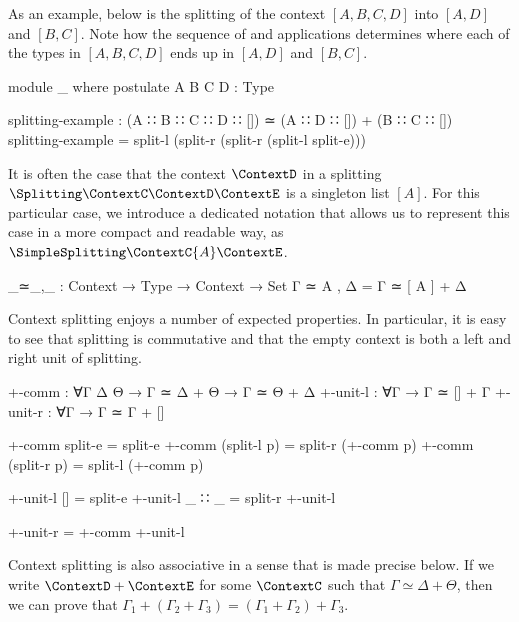 As an example, below is the splitting of the context $[A, B, C, D]$ into $[A,
D]$ and $[B, C]$. Note how the sequence of 
and  applications determines where each of the
types in $[A, B, C, D]$ ends up in $[A, D]$ and $[B, C]$.

\begin{code}[hide]
module _ where
  postulate A B C D : Type
\end{code}
\begin{code}
  splitting-example : (A ∷ B ∷ C ∷ D ∷ []) ≃ (A ∷ D ∷ []) + (B ∷ C ∷ [])
  splitting-example = split-l (split-r (split-r (split-l split-e)))
\end{code}

It is often the case that the context $\ContextD$ in a splitting
$\Splitting\ContextC\ContextD\ContextE$ is a singleton list $[A]$. For this
particular case, we introduce a dedicated notation that allows us to represent
this case in a more compact and readable way, as
$\SimpleSplitting\ContextC{A}\ContextE$.

\begin{code}
_≃_,_ : Context → Type → Context → Set
Γ ≃ A , Δ = Γ ≃ [ A ] + Δ
\end{code}

Context splitting enjoys a number of expected properties. In particular, it is
easy to see that splitting is commutative and that the empty context is both a
left and right unit of splitting.

\begin{code}
+-comm    : ∀{Γ Δ Θ} → Γ ≃ Δ + Θ → Γ ≃ Θ + Δ
+-unit-l  : ∀{Γ} → Γ ≃ [] + Γ
+-unit-r  : ∀{Γ} → Γ ≃ Γ + []
\end{code}
\begin{code}[hide]
+-comm split-e = split-e
+-comm (split-l p) = split-r (+-comm p)
+-comm (split-r p) = split-l (+-comm p)

+-unit-l {[]} = split-e
+-unit-l {_ ∷ _} = split-r +-unit-l

+-unit-r = +-comm +-unit-l
\end{code}

Context splitting is also associative in a sense that is made precise below. If
we write $\ContextD + \ContextE$ for some $\ContextC$ such that $Γ ≃ Δ + Θ$, then
we can prove that $Γ_1 + (Γ_2 + Γ_3) = (Γ_1 + Γ_2) + Γ_3$.

